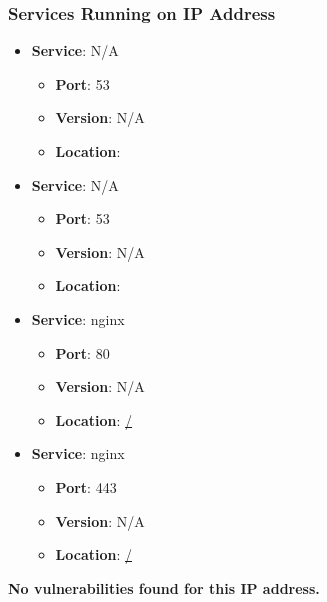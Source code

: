 \documentclass{article}
\begin{document}
\subsubsection*{Services Running on IP Address}

\begin{itemize}
    
        \item \textbf{Service}: N/A
        \begin{itemize}
            \item \textbf{Port}: 53
            \item \textbf{Version}:  N/A 
            \item \textbf{Location}: \href{  }{  }
        \end{itemize}
    
        \item \textbf{Service}: N/A
        \begin{itemize}
            \item \textbf{Port}: 53
            \item \textbf{Version}:  N/A 
            \item \textbf{Location}: \href{  }{  }
        \end{itemize}
    
        \item \textbf{Service}: nginx
        \begin{itemize}
            \item \textbf{Port}: 80
            \item \textbf{Version}:  N/A 
            \item \textbf{Location}: \href{ / }{ / }
        \end{itemize}
    
        \item \textbf{Service}: nginx
        \begin{itemize}
            \item \textbf{Port}: 443
            \item \textbf{Version}:  N/A 
            \item \textbf{Location}: \href{ / }{ / }
        \end{itemize}
    
\end{itemize}


\textbf{No vulnerabilities found for this IP address.}




\clearpage
\end{document}
